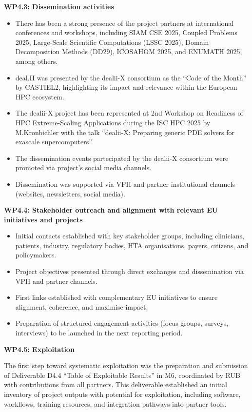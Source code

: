 \documentclass[a4paper,12pt, numbers]{article}
\begin{document}
\noindent\textbf{WP4.3: Dissemination activities}

\begin{itemize}[left=1em, itemsep=0pt, topsep=0pt]
\item There has been a strong presence of the project partners at international conferences and workshops, including SIAM CSE 2025, Coupled Problems 2025, Large-Scale Scientific Computations (LSSC 2025), Domain Decomposition Methods (DD29), ICOSAHOM 2025, and ENUMATH 2025, among others.
\item deal.II was presented by the dealii-X consortium as the “Code of the Month” by CASTIEL2, highlighting its impact and relevance within the European HPC ecosystem. 
\item The dealii-X project has been represented at 2nd Workshop on Readiness of HPC Extreme-Scaling Applications during the ISC HPC 2025 by M.Kronbichler with the talk ``dealii-X: Preparing generic PDE solvers for exascale supercomputers''.
\item The dissemination events partecipated by the dealii-X consortium were promoted via project's social media channels. 
\item Dissemination was supported via VPH and partner institutional channels (websites, newsletters, social media).
\end{itemize}

\noindent\textbf{WP4.4: Stakeholder outreach and alignment with relevant EU initiatives and projects} %


\begin{itemize}[left=1em, itemsep=0pt, topsep=0pt]
\item Initial contacts established with key stakeholder groups, including clinicians, patients, industry, regulatory bodies, HTA organisations, payers, citizens, and policymakers.
\item Project objectives presented through direct exchanges and dissemination via VPH and partner channels.
\item First links established with complementary EU initiatives to ensure alignment, coherence, and maximise impact.
\item Preparation of structured engagement activities (focus groups, surveys, interviews) to be launched in the next reporting period.
\end{itemize}



\noindent\textbf{WP4.5: Exploitation}

The first step toward systematic exploitation was the preparation and submission of Deliverable D4.4 ``Table of Exploitable Results'' in M6, coordinated by RUB with contributions from all partners. This deliverable established an initial inventory of project outputs with potential for exploitation, including software, workflows, training resources, and integration pathways into partner tools.  
\end{document}
